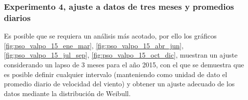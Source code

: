 \subsubsection{Experimento 4, ajuste a datos de tres meses y promedios diarios}
Es posible que se requiera un análisis más acotado, por ello los gráficos \ref{fig:pso_valpo_15_ene_mar}, \ref{fig:pso_valpo_15_abr_jun}, 
\ref{fig:pso_valpo_15_jul_sep}, \ref{fig:pso_valpo_15_oct_dic}, muestran un ajuste considerando un lapso de 3 meses para el año 2015, con el
que se demuestra que es posible definir cualquier intervalo (manteniendo como unidad de dato el promedio diario de velocidad del viento)
 y obtener un ajuste adecuado de los datos mediante la distribución de Weibull.

\begin{figure}[ht!]
    \centering
    \\  
\end{figure}
